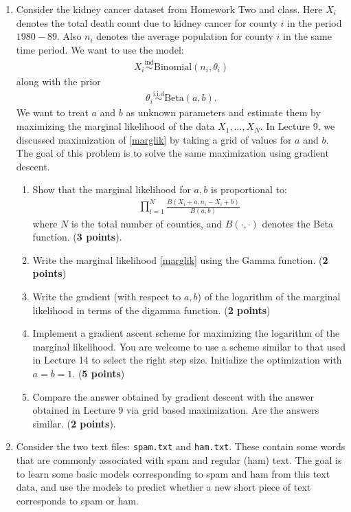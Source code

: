 \documentclass{scrartcl}
\begin{document}
\begin{enumerate}
\item Consider the kidney cancer dataset from Homework Two and
  class. Here $X_i$ denotes the total death count due to kidney cancer
  for county $i$ in the period $1980-89$. Also $n_i$ denotes the
  average population for county $i$ in the same time period. We want
  to use the model:
  \begin{align*}
    X_i \overset{\text{ind}}{\sim} \text{Binomial}(n_i, \theta_i)  
  \end{align*}
  along with the prior
  \begin{align*}
    \theta_i \overset{\text{i.i.d}}{\sim} \text{Beta}(a, b). 
  \end{align*}
  We want to treat $a$ and $b$ as unknown parameters and estimate them
  by maximizing the marginal likelihood of the data $X_1, \dots,
  X_N$. In Lecture 9, we discussed maximization of \eqref{marglik} by
     taking a grid of values for $a$ and $b$. The goal of this problem
     is to solve the same maximization using gradient descent. 
  \begin{enumerate}
  \item Show that the marginal likelihood for $a, b$ is proportional to:
    \begin{align}\label{marglik}
      \prod_{i=1}^N \frac{B(X_i + a, n_i - X_i + b)}{B(a, b)}
    \end{align}
    where $N$ is the total number of counties, and $B(\cdot, \cdot)$
    denotes the Beta function. (\textbf{3 points}).
   \item Write the marginal likelihood \eqref{marglik} using the Gamma
     function. (\textbf{2 points})
   \item Write the gradient (with respect to $a, b$) of the logarithm
     of the marginal likelihood in terms of the digamma
     function. (\textbf{2 points})
   \item Implement a gradient ascent scheme for maximizing the
     logarithm of the marginal likelihood. You are welcome to use a
     scheme similar to that used in Lecture 14 to select the right
     step size. Initialize the optimization with $a = b =
     1$. (\textbf{5 points})
   \item Compare the answer obtained by gradient descent with the
     answer obtained in Lecture 9 via grid based maximization. Are the
     answers similar. (\textbf{2 points}). 
  \end{enumerate}

\item Consider the two text files: \texttt{spam.txt} and
  \texttt{ham.txt}. These contain some words that are commonly
  associated with spam and regular (ham) text. The goal is to learn
  some basic models corresponding to spam and ham from this text data,
  and use the models to predict whether a new short piece of text
  corresponds to spam or ham.    


\end{enumerate}
\end{document}
